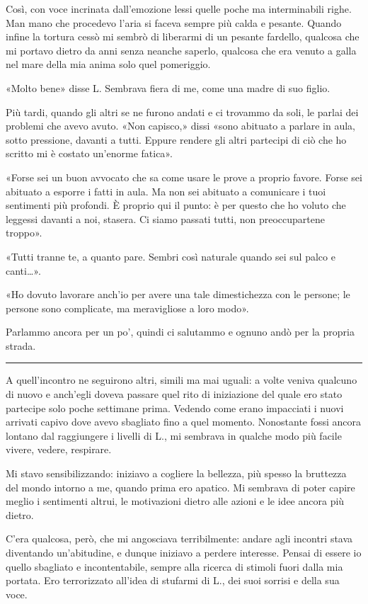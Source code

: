\documentclass[a4paper,10pt]{memoir}
\begin{document}
Così, con voce incrinata dall'emozione lessi quelle poche ma interminabili righe. Man mano che procedevo l'aria si
faceva sempre più calda e pesante. Quando infine la tortura cessò mi sembrò di liberarmi di un pesante fardello,
qualcosa che mi portavo dietro da anni senza neanche saperlo, qualcosa che era venuto a galla nel mare della mia anima
solo quel pomeriggio.

«Molto bene» disse L. Sembrava fiera di me, come una madre di suo figlio.

Più tardi, quando gli altri se ne furono andati e ci trovammo da soli, le parlai dei problemi che avevo avuto. «Non
capisco,» dissi «sono abituato a parlare in aula, sotto pressione, davanti a tutti. Eppure rendere gli altri partecipi
di ciò che ho scritto mi è costato un'enorme fatica».

«Forse sei un buon avvocato che sa come usare le prove a proprio favore. Forse sei abituato a esporre i fatti in aula.
Ma non sei abituato a comunicare i tuoi sentimenti più profondi. È proprio qui il punto: è per questo che ho voluto che
leggessi davanti a noi, stasera. Ci siamo passati tutti, non preoccupartene troppo».

«Tutti tranne te, a quanto pare. Sembri così naturale quando sei sul palco e
canti\dots{}».

«Ho dovuto lavorare anch'io per avere una tale dimestichezza con le persone; le persone sono complicate, ma meravigliose
a loro modo».

Parlammo ancora per un po', quindi ci salutammo e ognuno andò per la propria strada.

\plainbreak{1}

A quell'incontro ne seguirono altri, simili ma mai uguali: a volte veniva qualcuno di nuovo e anch'egli doveva passare
quel rito di iniziazione del quale ero stato partecipe solo poche settimane prima. Vedendo come erano impacciati i nuovi
arrivati capivo dove avevo sbagliato fino a quel momento. Nonostante fossi ancora lontano dal raggiungere i livelli di
L., mi sembrava in qualche modo più facile vivere, vedere, respirare.

Mi stavo sensibilizzando: iniziavo a cogliere la bellezza, più spesso la bruttezza del mondo intorno a me, quando prima
ero apatico. Mi sembrava di poter capire meglio i sentimenti altrui, le motivazioni dietro alle azioni e le idee ancora
più dietro.

C'era qualcosa, però, che mi angosciava terribilmente: andare agli incontri stava diventando un'abitudine, e dunque
iniziavo a perdere interesse. Pensai di essere io quello sbagliato e incontentabile, sempre alla ricerca di stimoli
fuori dalla mia portata. Ero terrorizzato all'idea di stufarmi di L., dei suoi sorrisi e della sua voce.
\end{document}
